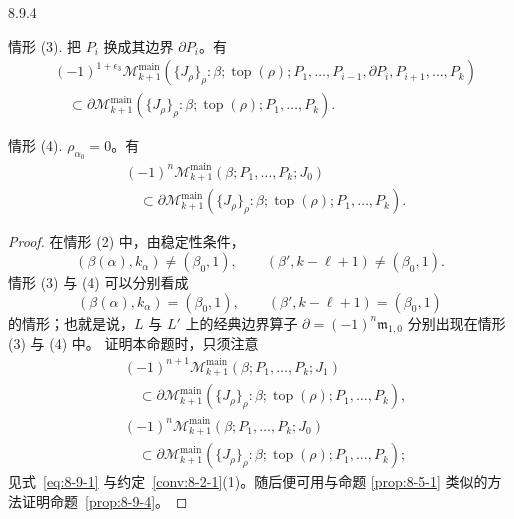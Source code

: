 \begin{proposition}{8.9.4}
\par\smallskip\noindent
\textup{情形 (3).}
把 $P_i$ 换成其边界 $\partial P_i$。有
\[
\begin{aligned}
 &(-1)^{1+\epsilon_3}
 \mathcal M_{k+1}^{\mathrm{main}}
 (\{J_\rho\}_\rho:\beta;\operatorname{top}(\rho);
 P_1,\ldots,P_{i-1},\partial P_i,P_{i+1},\ldots,P_k)\\
 &\quad\subset
 \partial\mathcal M_{k+1}^{\mathrm{main}}
 (\{J_\rho\}_\rho:\beta;\operatorname{top}(\rho);
 P_1,\ldots,P_k).
\end{aligned}
\]

\par\smallskip\noindent
\textup{情形 (4).}
$\rho_{\alpha_0}=0$。有
\[
\begin{aligned}
 &(-1)^n
 \mathcal M_{k+1}^{\mathrm{main}}
 (\beta;P_1,\ldots,P_k;J_0)\\
 &\quad\subset
 \partial\mathcal M_{k+1}^{\mathrm{main}}
 (\{J_\rho\}_\rho:\beta;\operatorname{top}(\rho);
 P_1,\ldots,P_k).
\end{aligned}
\]
\end{proposition}

\begin{proof}
在情形 (2) 中，由稳定性条件，
\[
 (\beta(\alpha),k_\alpha)\ne(\beta_0,1),
 \qquad
 (\beta',k-\ell+1)\ne(\beta_0,1).
\]
情形 (3) 与 (4) 可以分别看成
\[
 (\beta(\alpha),k_\alpha)=(\beta_0,1),
 \qquad
 (\beta',k-\ell+1)=(\beta_0,1)
\]
的情形；也就是说，$L$ 与 $L'$ 上的经典边界算子
$\partial=(-1)^n\mathfrak m_{1,0}$ 分别出现在情形 (3) 与 (4) 中。
证明本命题时，只须注意
\[
\begin{aligned}
 &(-1)^{n+1}
 \mathcal M_{k+1}^{\mathrm{main}}
 (\beta;P_1,\ldots,P_k;J_1)\\
 &\quad\subset
 \partial\mathcal M_{k+1}^{\mathrm{main}}
 (\{J_\rho\}_\rho:\beta;\operatorname{top}(\rho);
 P_1,\ldots,P_k),\\[4pt]
 &(-1)^n
 \mathcal M_{k+1}^{\mathrm{main}}
 (\beta;P_1,\ldots,P_k;J_0)\\
 &\quad\subset
 \partial\mathcal M_{k+1}^{\mathrm{main}}
 (\{J_\rho\}_\rho:\beta;\operatorname{top}(\rho);
 P_1,\ldots,P_k);
\end{aligned}
\]
见式~\eqref{eq:8-9-1} 与约定~\ref{conv:8-2-1}(1)。随后便可用与命题
\ref{prop:8-5-1} 类似的方法证明命题~\ref{prop:8-9-4}。
\end{proof}

